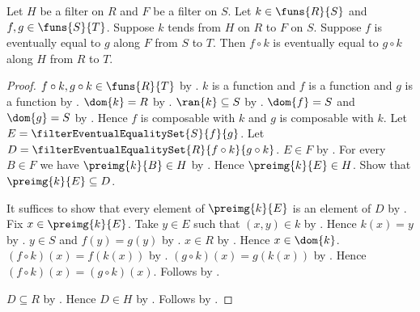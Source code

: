 \begin{proposition}\label{filter_eventually_equal_precompose}
    Let $H$ be a filter on $R$ and $F$ be a filter on $S$.
    Let $k\in\funs{R}{S}$ and $f,g\in\funs{S}{T}$.
    Suppose $k$ tends from $H$ on $R$ to $F$ on $S$.
    Suppose $f$ is eventually equal to $g$ along $F$ from $S$ to $T$.
    Then $f\circ k$ is eventually equal to $g\circ k$ along $H$ from
        $R$ to $T$.
\end{proposition}
\begin{proof}
    $f\circ k,g\circ k\in\funs{R}{T}$ by .
    $k$ is a function and $f$ is a function and $g$ is a function by
        .
    $\dom{k}=R$ by .
    $\ran{k}\subseteq S$ by .
    $\dom{f}=S$ and $\dom{g}=S$ by .
    Hence $f$ is composable with $k$ and $g$ is composable with $k$.
    Let $E=\filterEventualEqualitySet{S}{f}{g}$.
    Let $D=\filterEventualEqualitySet{R}{f\circ k}{g\circ k}$.
    $E\in F$ by .
    For every $B\in F$ we have $\preimg{k}{B}\in H$ by
        .
    Hence $\preimg{k}{E}\in H$.
    Show that $\preimg{k}{E}\subseteq D$.
    \begin{subproof}
        It suffices to show that every element of $\preimg{k}{E}$ is an
            element of $D$ by .
        Fix $x\in\preimg{k}{E}$.
        Take $y\in E$ such that $(x,y)\in k$ by .
        Hence $k(x)=y$ by .
        $y\in S$ and $f(y)=g(y)$ by
            .
        $x\in R$ by .
        Hence $x\in\dom{k}$.
        $(f\circ k)(x)=f(k(x))$ by .
        $(g\circ k)(x)=g(k(x))$ by .
        Hence $(f\circ k)(x)=(g\circ k)(x)$.
        Follows by .
    \end{subproof}
    $D\subseteq R$ by
        .
    Hence $D\in H$ by .
    Follows by .
\end{proof}
